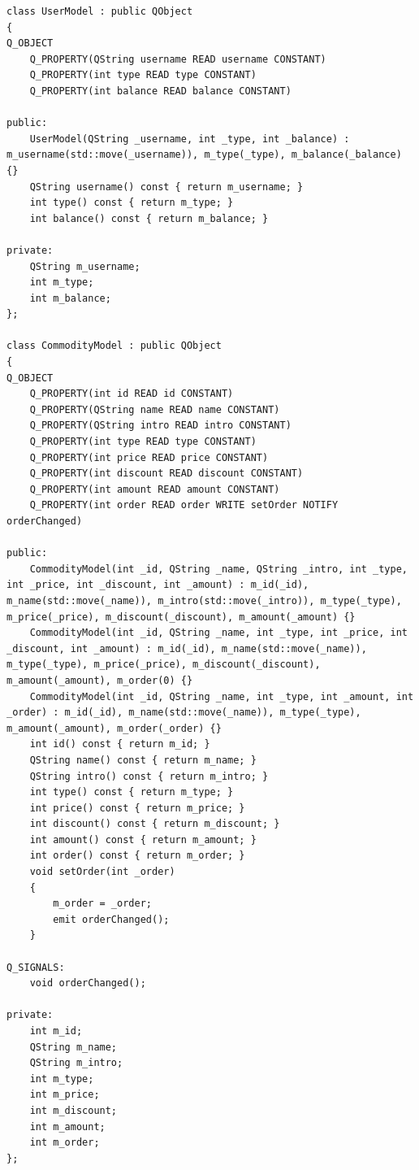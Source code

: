 \documentclass[lang=cn,11pt,a4paper,cite=authornum]{paper}
\begin{document}
\begin{code}
\begin{verbatim}
class UserModel : public QObject
{
Q_OBJECT
    Q_PROPERTY(QString username READ username CONSTANT)
    Q_PROPERTY(int type READ type CONSTANT)
    Q_PROPERTY(int balance READ balance CONSTANT)
 
public:
    UserModel(QString _username, int _type, int _balance) : m_username(std::move(_username)), m_type(_type), m_balance(_balance) {}
    QString username() const { return m_username; }
    int type() const { return m_type; }
    int balance() const { return m_balance; }
 
private:
    QString m_username; 
    int m_type; 
    int m_balance; 
};
 
class CommodityModel : public QObject
{
Q_OBJECT
    Q_PROPERTY(int id READ id CONSTANT)
    Q_PROPERTY(QString name READ name CONSTANT)
    Q_PROPERTY(QString intro READ intro CONSTANT)
    Q_PROPERTY(int type READ type CONSTANT)
    Q_PROPERTY(int price READ price CONSTANT)
    Q_PROPERTY(int discount READ discount CONSTANT)
    Q_PROPERTY(int amount READ amount CONSTANT)
    Q_PROPERTY(int order READ order WRITE setOrder NOTIFY orderChanged)
 
public:
    CommodityModel(int _id, QString _name, QString _intro, int _type, int _price, int _discount, int _amount) : m_id(_id), m_name(std::move(_name)), m_intro(std::move(_intro)), m_type(_type), m_price(_price), m_discount(_discount), m_amount(_amount) {}
    CommodityModel(int _id, QString _name, int _type, int _price, int _discount, int _amount) : m_id(_id), m_name(std::move(_name)), m_type(_type), m_price(_price), m_discount(_discount), m_amount(_amount), m_order(0) {}
    CommodityModel(int _id, QString _name, int _type, int _amount, int _order) : m_id(_id), m_name(std::move(_name)), m_type(_type), m_amount(_amount), m_order(_order) {}
    int id() const { return m_id; }
    QString name() const { return m_name; }
    QString intro() const { return m_intro; }
    int type() const { return m_type; }
    int price() const { return m_price; }
    int discount() const { return m_discount; }
    int amount() const { return m_amount; }
    int order() const { return m_order; }
    void setOrder(int _order)
    {
        m_order = _order;
        emit orderChanged();
    }
 
Q_SIGNALS:
    void orderChanged();
 
private:
    int m_id; 
    QString m_name; 
    QString m_intro; 
    int m_type; 
    int m_price; 
    int m_discount; 
    int m_amount; 
    int m_order; 
};
 

\end{verbatim}
\end{code}
\end{document}
